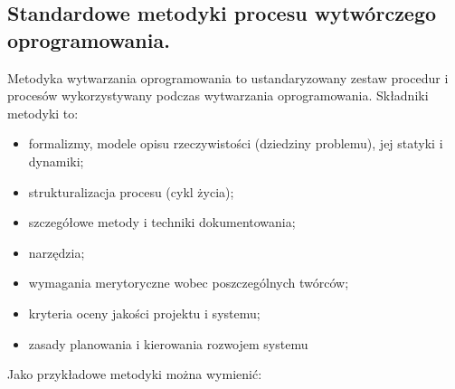 \documentclass[a4paper,12pt,oneside]{book}
\begin{document}
			\subsection{Standardowe metodyki procesu wytwórczego oprogramowania.}
				Metodyka wytwarzania oprogramowania to ustandaryzowany zestaw procedur i procesów wykorzystywany podczas wytwarzania oprogramowania.
                Składniki metodyki to:
                \begin{itemize}
                    \item formalizmy, modele opisu rzeczywistości (dziedziny problemu), jej 
                    statyki i dynamiki;
                    \item strukturalizacja procesu (cykl życia);
                    \item szczegółowe metody i techniki dokumentowania;
                    \item narzędzia;
                    \item wymagania merytoryczne wobec poszczególnych twórców;
                    \item kryteria oceny jakości projektu i systemu;
                    \item zasady planowania i kierowania rozwojem systemu
                \end{itemize}
                Jako przykładowe metodyki można wymienić:
\end{document}
